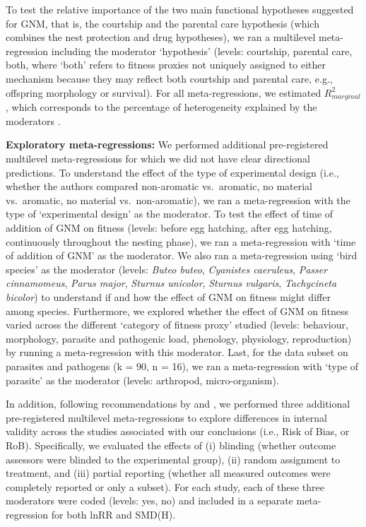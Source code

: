 \documentclass[
  number,
  review,
  onecolumn]{elsarticle}
\begin{document}
To test the relative importance of the two main functional hypotheses
suggested for GNM, that is, the courtship and the parental care
hypothesis (which combines the nest protection and drug
hypotheses)\ul{,} we ran a multilevel meta-regression including the
moderator `hypothesis' (levels: courtship, parental care, both, where
`both' refers to fitness proxies not uniquely assigned to either
mechanism because they may reflect both courtship and parental care,
e.g., offspring morphology or survival). For all meta-regressions, we
estimated \(R_{marginal}^2\), which corresponds to the percentage of
heterogeneity explained by the moderators \citep{nakagawa2012}.

\textbf{Exploratory meta-regressions:} We performed additional
pre-registered multilevel meta-regressions for which we did not have
clear directional predictions. To understand the effect of the type of
experimental design (i.e., whether the authors compared non-aromatic
vs.~aromatic, no material vs.~aromatic, no material vs.~non-aromatic),
we ran a meta-regression with the type of `experimental design' as the
moderator. To test the effect of time of addition of GNM on fitness
(levels: before egg hatching, after egg hatching, continuously
throughout the nesting phase), we ran a meta-regression with `time of
addition of GNM' as the moderator. We also ran a meta-regression using
`bird species' as the moderator (levels: \emph{Buteo buteo},
\emph{Cyanistes caeruleus}, \emph{Passer cinnamomeus}, \emph{Parus
major}, \emph{Sturnus unicolor}, \emph{Sturnus vulgaris},
\emph{Tachycineta bicolor}) to understand if and how the effect of GNM
on fitness might differ among species. Furthermore, we explored whether
the effect of GNM on fitness varied across the different `category of
fitness proxy' studied (levels: behaviour, morphology, parasite and
pathogenic load, phenology, physiology, reproduction) by running a
meta-regression with this moderator. Last, for the data subset on
parasites and pathogens (k = 90, n = 16), we ran a meta-regression with
`type of parasite' as the moderator (levels: arthropod, micro-organism).

In addition, following recommendations by \citep{stanhope2022} and
\citep{culina2025}, we performed three additional pre-registered
multilevel meta-regressions to explore differences in internal validity
across the studies associated with our conclusions (i.e., Risk of Bias,
or RoB). Specifically, we evaluated the effects of (i) blinding (whether
outcome assessors were blinded to the experimental group), (ii) random
assignment to treatment, and (iii) partial reporting (whether all
measured outcomes were completely reported or only a subset). For each
study, each of these three moderators were coded (levels: yes, no) and
included in a separate meta-regression for both lnRR and SMD(H).
\end{document}
